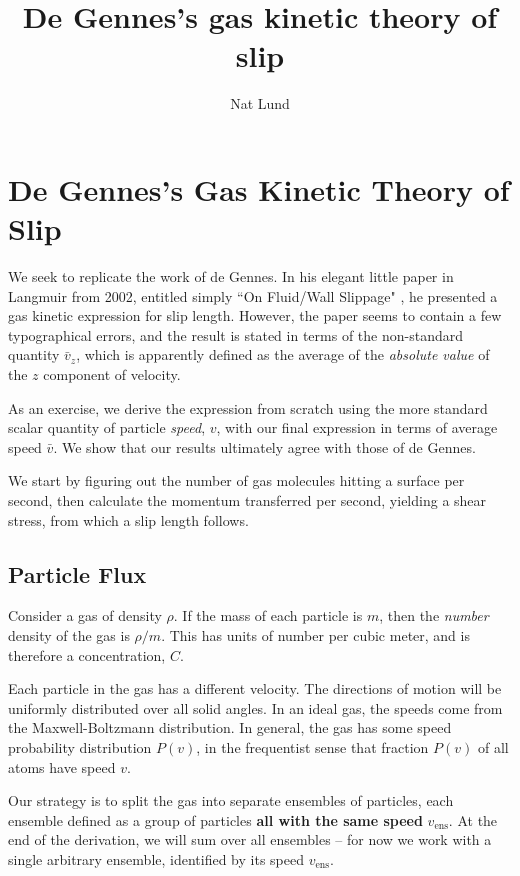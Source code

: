 \documentclass[12pt, a4paper, twoside, openright]{book}
\title{De Gennes's gas kinetic theory of slip}
\author{Nat Lund}
\newcommand{\vens}{\ensuremath{v_{\mathrm{ens}}}}
\begin{document}
\chapter{De Gennes's Gas Kinetic Theory of Slip}\label{C:degennes}

We seek to replicate the work of de Gennes. In his elegant little paper in Langmuir from 2002, entitled simply ``On Fluid/Wall Slippage" \cite{deGennes2002}, he presented a gas kinetic expression for slip length.  However, the paper seems to contain a few typographical errors, and the result is stated in terms of the non-standard quantity $\bar{v}_z$, which is apparently defined as the average of the \emph{absolute value} of the $z$ component of velocity.

As an exercise, we derive the expression from scratch using the more standard scalar quantity of particle \emph{speed}, $v$, with our final expression in terms of average speed $\bar{v}$.  We show that our results ultimately agree with those of de Gennes.%

\vspace{1em}
We start by figuring out the number of gas molecules hitting a surface per second, then calculate the momentum transferred per second, yielding a shear stress, from which a slip length follows.

\clearpage
\section{Particle Flux}

Consider a gas of density $\rho$.  If the mass of each particle is $m$, then the \emph{number} density of the gas is $\rho / m$.  This has units of number per cubic meter, and is therefore a concentration, $C$.

Each particle in the gas has a different velocity. The directions of motion will be uniformly distributed over all solid angles. In an ideal gas, the speeds come from the Maxwell-Boltzmann distribution.
In general, the gas has some speed probability distribution $P(v)$, in the frequentist sense that fraction $P(v)$ of all atoms have speed $v$.

\vspace*{1em}
Our strategy is to split the gas into separate ensembles of particles, each ensemble defined as a group of particles \textbf{all with the same speed} $\vens$.
At the end of the derivation, we will sum over all ensembles -- for now we work with a single arbitrary ensemble, identified by its speed $\vens$.
\end{document}

